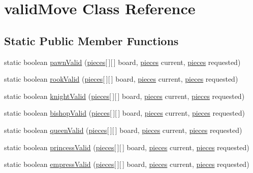 \hypertarget{classvalidMove}{\section{valid\-Move Class Reference}
\label{classvalidMove}
}
\subsection*{Static Public Member Functions}
\begin{DoxyCompactItemize}
\item 
static boolean \hyperlink{classvalidMove_a4a890235e327a561b21494e3e1c11fdc}{pawn\-Valid} (\hyperlink{classpieces}{pieces}\mbox{[}$\,$\mbox{]}\mbox{[}$\,$\mbox{]} board, \hyperlink{classpieces}{pieces} current, \hyperlink{classpieces}{pieces} requested)
\item 
static boolean \hyperlink{classvalidMove_a1fad9b7f674459755cbfa6a093371010}{rook\-Valid} (\hyperlink{classpieces}{pieces}\mbox{[}$\,$\mbox{]}\mbox{[}$\,$\mbox{]} board, \hyperlink{classpieces}{pieces} current, \hyperlink{classpieces}{pieces} requested)
\item 
static boolean \hyperlink{classvalidMove_a06e247e1e717bde70bb504e04584c61e}{knight\-Valid} (\hyperlink{classpieces}{pieces}\mbox{[}$\,$\mbox{]}\mbox{[}$\,$\mbox{]} board, \hyperlink{classpieces}{pieces} current, \hyperlink{classpieces}{pieces} requested)
\item 
static boolean \hyperlink{classvalidMove_a878fc200b48f777b187908d2eec95e8b}{bishop\-Valid} (\hyperlink{classpieces}{pieces}\mbox{[}$\,$\mbox{]}\mbox{[}$\,$\mbox{]} board, \hyperlink{classpieces}{pieces} current, \hyperlink{classpieces}{pieces} requested)
\item 
static boolean \hyperlink{classvalidMove_a73bdc32b286f5c071ce4de02b767a290}{queen\-Valid} (\hyperlink{classpieces}{pieces}\mbox{[}$\,$\mbox{]}\mbox{[}$\,$\mbox{]} board, \hyperlink{classpieces}{pieces} current, \hyperlink{classpieces}{pieces} requested)
\item 
static boolean \hyperlink{classvalidMove_adac8f690ee1a78de69ae0ebbd2aa6a88}{princess\-Valid} (\hyperlink{classpieces}{pieces}\mbox{[}$\,$\mbox{]}\mbox{[}$\,$\mbox{]} board, \hyperlink{classpieces}{pieces} current, \hyperlink{classpieces}{pieces} requested)
\item 
static boolean \hyperlink{classvalidMove_ac5d37e4fc1b5a5a14c4420c41bfcb047}{empress\-Valid} (\hyperlink{classpieces}{pieces}\mbox{[}$\,$\mbox{]}\mbox{[}$\,$\mbox{]} board, \hyperlink{classpieces}{pieces} current, \hyperlink{classpieces}{pieces} requested)
\end{DoxyCompactItemize}


